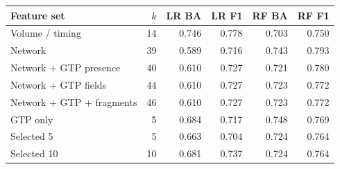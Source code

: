 \begin{tabularx}{\textwidth}{@{}L r r r r r@{}}
\toprule
Feature set & $k$ & LR BA & LR F1 & RF BA & RF F1 \\
\midrule
Volume / timing & 14 & 0.746 & 0.778 & 0.703 & 0.750 \\
Network & 39 & 0.589 & 0.716 & 0.743 & 0.793 \\
Network + GTP presence & 40 & 0.610 & 0.727 & 0.721 & 0.780 \\
Network + GTP fields & 44 & 0.610 & 0.727 & 0.723 & 0.772 \\
Network + GTP + fragments & 46 & 0.610 & 0.727 & 0.723 & 0.772 \\
GTP only & 5 & 0.684 & 0.717 & 0.748 & 0.769 \\
Selected 5 & 5 & 0.663 & 0.704 & 0.724 & 0.764 \\
Selected 10 & 10 & 0.681 & 0.737 & 0.724 & 0.764 \\
\bottomrule
\end{tabularx}
